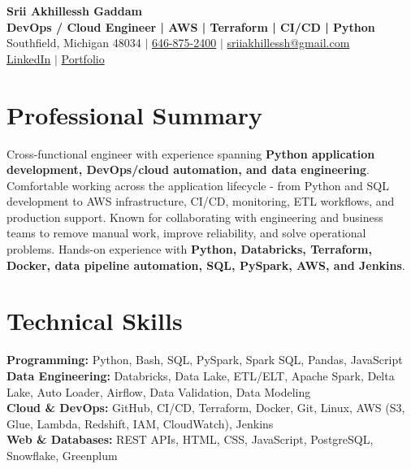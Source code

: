 \documentclass[letterpaper,10pt]{article}
\begin{document}
\fontsize{9.35pt}{10.45pt}\selectfont

\begin{center}
    {\LARGE \textbf{Srii Akhillessh Gaddam}} \\[-1pt]
    \textbf{DevOps / Cloud Engineer | AWS | Terraform | CI/CD | Python} \\[2pt]
    Southfield, Michigan 48034 $|$
    \href{tel:6468752400}{646-875-2400} $|$
    \href{mailto:sriiakhillessh@gmail.com}{sriiakhillessh@gmail.com} \\[1pt]
    \href{https://www.linkedin.com/in/srii-akhiilessh-gaddam-b48668191/}{LinkedIn} $|$
    \href{https://sriiakhillesshg.github.io/portfolio/}{Portfolio}
\end{center}
\vspace{-8pt}

\section{Professional Summary}
\small{Cross-functional engineer with experience spanning \textbf{Python application development, DevOps/cloud automation, and data engineering}. Comfortable working across the application lifecycle - from Python and SQL development to AWS infrastructure, CI/CD, monitoring, ETL workflows, and production support. Known for collaborating with engineering and business teams to remove manual work, improve reliability, and solve operational problems. Hands-on experience with \textbf{Python, Databricks, Terraform, Docker, data pipeline automation, SQL, PySpark, AWS, and Jenkins}.}

\section{Technical Skills}
\small{
\textbf{Programming:} Python, Bash, SQL, PySpark, Spark SQL, Pandas, JavaScript \\
\textbf{Data Engineering:} Databricks, Data Lake, ETL/ELT, Apache Spark, Delta Lake, Auto Loader, Airflow, Data Validation, Data Modeling \\
\textbf{Cloud \& DevOps:} GitHub, CI/CD, Terraform, Docker, Git, Linux, AWS (S3, Glue, Lambda, Redshift, IAM, CloudWatch), Jenkins \\
\textbf{Web \& Databases:} REST APIs, HTML, CSS, JavaScript, PostgreSQL, Snowflake, Greenplum
}
\end{document}
